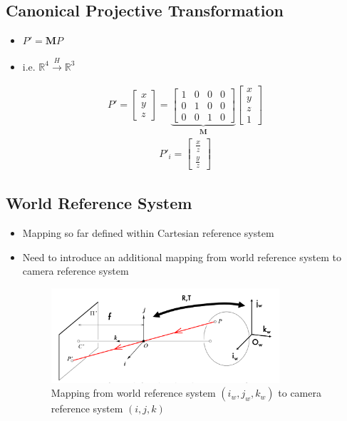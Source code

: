 \documentclass[letterpaper,12pt]{article}
\newcommand{\matr}[1]{\mathbf{#1}}
\begin{document}
\subsection{Canonical Projective Transformation}
\begin{itemize}
 \item $P' = \matr{M} P$
 \item i.e. $\mathbb{R}^4 \xrightarrow{H} \mathbb{R}^3$
\end{itemize}
\begin{align}
 P' = \begin{bmatrix}
  x \\
  y \\
  z
 \end{bmatrix}=\underbrace{\begin{bmatrix}
   1 & 0 & 0 & 0 \\
   0 & 1 & 0 & 0 \\
   0 & 0 & 1 & 0
  \end{bmatrix}}_\matr{M}
 \begin{bmatrix}
  x \\
  y \\
  z \\
  1
 \end{bmatrix}
\end{align}
\begin{align}
 P'_i = \begin{bmatrix}
  \frac{x}{z} \\
  \frac{y}{z}
 \end{bmatrix}
\end{align}

\subsection{World Reference System}
\begin{itemize}
 \item Mapping so far defined within Cartesian reference system
 \item Need to introduce an additional mapping from world reference system to camera reference system
       \begin{figure}[h!]
        \centering
        \includegraphics[width=0.8\textwidth]{images/world_reference_system.png}
        \caption{Mapping from world reference system $(i_w, j_w, k_w)$ to camera reference system $(i, j, k)$}
       \end{figure}
\end{itemize}
\end{document}

